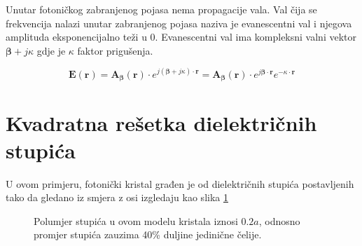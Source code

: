 \documentclass[utf8, seminar, numeric]{fer}
\begin{document}
\FloatBarrier
Unutar fotoničkog zabranjenog pojasa nema propagacije vala. Val čija se
frekvencija nalazi unutar zabranjenog pojasa naziva je evanescentni val i
njegova amplituda eksponencijalno teži u 0. Evanescentni val ima kompleksni valni
vektor ${\bm{\beta}} + j \kappa$ gdje je $\kappa$ faktor prigušenja.

\begin{equation} \label{eq:evan}
	\mathbf{E}(\mathbf{r}) =
	\mathbf{A}_{\bm{\beta}}(\mathbf{r}) \cdot
		e^{j ({\bm{\beta}} + j \kappa) \cdot \mathbf{r}} =
	\mathbf{A}_{\bm{\beta}}(\mathbf{r}) \cdot
		e^{j {\bm{\beta}} \cdot \mathbf{r}} e^{-\kappa \cdot \mathbf{r}}
\end{equation}


\section{Kvadratna rešetka dielektričnih stupića}

U ovom primjeru, fotonički kristal građen je od dielektričnih stupića
postavljenih tako da gledano iz smjera z osi izgledaju kao slika
\ref{fig:square_lattice}

\begin{figure}[ht]
\centering
    \qquad
	\caption{Polumjer stupića u ovom modelu kristala iznosi ${0.2 a}$, odnosno
	promjer stupića zauzima 40\% duljine jedinične čelije.}
	\label{fig:square_lattice}
\end{figure}
\end{document}
